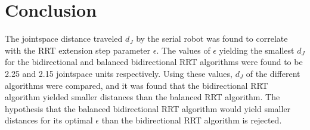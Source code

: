 \section{Conclusion} 
The jointspace distance traveled \(d_J\) by the serial robot was
found to correlate with the RRT extension step parameter \(\epsilon\).
The values of \(\epsilon\) yielding the smallest \(d_J\) for the
bidirectional and balanced bidirectional RRT algorithms
were found to be 2.25 and 2.15 jointspace units respectively.
Using these values, \(d_J\) of the different algorithms were compared,
and it was found that the bidirectional RRT algorithm yielded
smaller distances than the balanced RRT algorithm.
The hypothesis that the balanced bidirectional RRT algorithm
would yield smaller distances for its optimal \(\epsilon\) than
the bidirectional RRT algorithm is rejected.